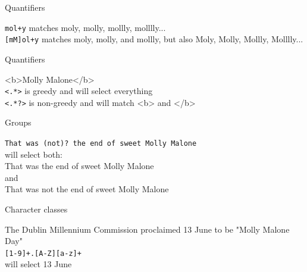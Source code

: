 \documentclass[handout]{beamer}
\begin{document}
\begin{frame}[fragile]{Quantifiers}
	
\lstinline{mol+y} matches moly, molly, mollly, molllly...  \\
\lstinline{[mM]ol+y} matches moly, molly, and mollly, but also Moly, Molly, Mollly, Molllly... 
	
	

	
\end{frame}


\begin{frame}[fragile]{Quantifiers}
	
	<b>Molly Malone</b> \\
	\lstinline{<.*>} is greedy and will select everything   \\
	\lstinline{<.*?>} is non-greedy and will match <b> and </b>

	
	
	
\end{frame}


\begin{frame}[fragile]{Groups}
	
	\lstinline{That was (not)? the end of sweet Molly Malone} \\ 
	will select both:   \\
	That was the end of sweet Molly Malone \\
	and \\
	That was not the end of sweet Molly Malone
		
	
\end{frame}


\begin{frame}[fragile]{Character classes}
	
	
	The Dublin Millennium Commission proclaimed 13 June to be "Molly Malone Day" \\
	\lstinline{[1-9]+.[A-Z][a-z]+} \\ 
	will select 13 June

	
	

\end{frame}
\end{document}
